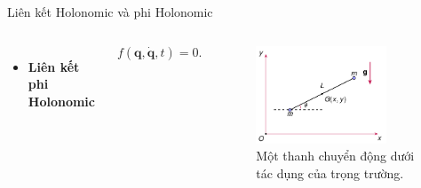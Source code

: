 \begin{frame}{Liên kết Holonomic và phi Holonomic}
\begin{columns}
    \begin{itemize}
        \item\textbf{Liên kết phi Holonomic}
    \end{itemize}
    \begin{equation}
        f \left( \mathbf{q}, \dot{\mathbf{q}}, t \right) = 0.
    \end{equation}
    \vspace{-9mm}
    \begin{figure}
        \centering
        \includegraphics[width=0.8\textwidth]{Figures/NonHolonomic_example.pdf}
        \vspace{-2mm}
        \caption{Một thanh chuyển động dưới tác dụng của trọng trường.}
    \end{figure}
\end{columns}
\end{frame}

